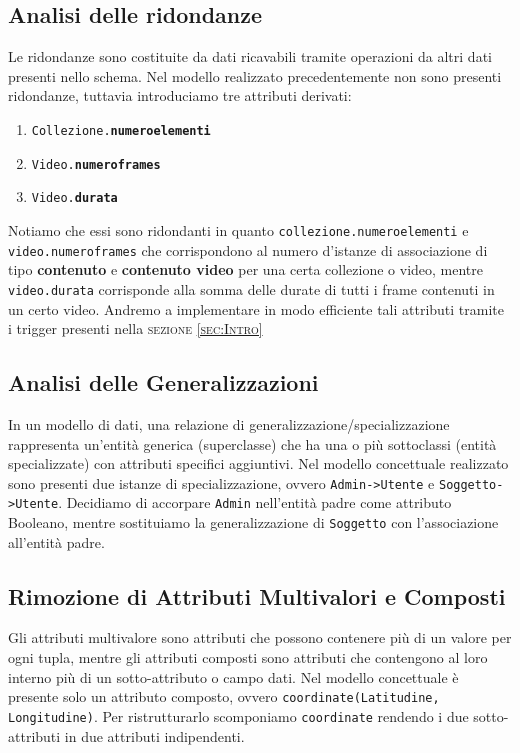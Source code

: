 \documentclass[a4paper,12pt,oneside]{book}
\begin{document}
    \subsection{Analisi delle ridondanze}
    Le ridondanze sono costituite da dati ricavabili tramite operazioni da altri dati presenti nello schema. Nel modello realizzato precedentemente non sono presenti ridondanze, tuttavia introduciamo tre attributi derivati:
    \begin{enumerate}

         \item\texttt{Collezione.\textbf{numero\textunderscore elementi}}
         \item\texttt{Video.\textbf{numero\textunderscore frames}}
         \item\texttt{Video.\textbf{durata}}


    \end{enumerate}
    Notiamo che essi sono ridondanti in quanto \texttt{collezione.numero\textunderscore elementi} e \texttt{video.numero\textunderscore frames} che corrispondono al numero d'istanze di associazione di tipo \textbf{contenuto} e \textbf{contenuto video} per una certa collezione o video, mentre \texttt{video.durata} corrisponde alla somma delle durate di tutti i frame contenuti in un certo video.
    Andremo a implementare in modo  efficiente tali attributi tramite i trigger presenti nella \textsc{sezione \ref{sec:Intro}}

    \subsection{Analisi delle Generalizzazioni}
    In un modello di dati, una relazione di generalizzazione/specializzazione rappresenta un'entità generica (superclasse) che ha una o più sottoclassi (entità specializzate) con attributi specifici aggiuntivi. Nel modello concettuale realizzato sono presenti due istanze di specializzazione, ovvero \texttt{Admin->Utente} e \texttt{Soggetto->Utente}. Decidiamo di accorpare \texttt{Admin} nell'entità padre come attributo Booleano, mentre sostituiamo la generalizzazione di \texttt{Soggetto} con l'associazione all'entità padre.
    
    \subsection{Rimozione di Attributi Multivalori e Composti}
    Gli attributi multivalore sono attributi che possono contenere più di un valore per ogni tupla, mentre gli attributi composti sono attributi che contengono al loro interno più di un sotto-attributo o campo dati. Nel modello concettuale è presente solo un attributo composto, ovvero \texttt{coordinate(Latitudine, Longitudine)}. Per ristrutturarlo scomponiamo \texttt{coordinate} rendendo i due sotto-attributi in due attributi indipendenti.
    
\end{document}
